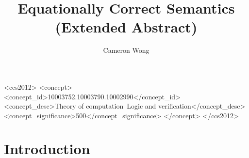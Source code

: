 \documentclass[manuscript,screen,sigplan]{acmart}
\begin{document}
\title{Equationally Correct Semantics (Extended Abstract)}

\author{Cameron Wong}

\renewcommand{\shortauthors}{Wong}

\newcommand{\N}{\mathbb{N}}

\begin{CCSXML}
<ccs2012>
<concept>
<concept_id>10003752.10003790.10002990</concept_id>
<concept_desc>Theory of computation~Logic and verification</concept_desc>
<concept_significance>500</concept_significance>
</concept>
</ccs2012>
\end{CCSXML}


\maketitle

\section{Introduction}

\end{document}
